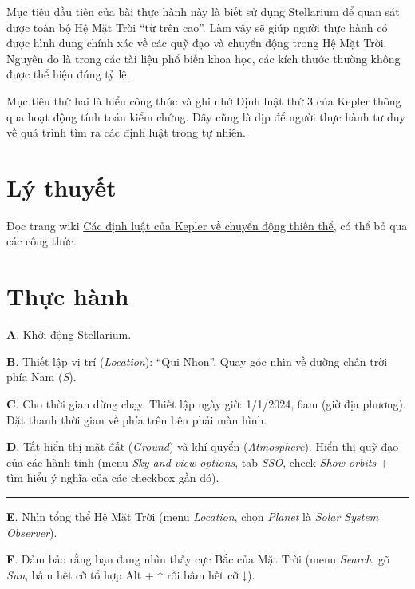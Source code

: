 \documentclass[
]{book}
\begin{document}
Mục tiêu đầu tiên của bài thực hành này là biết sử dụng Stellarium để quan sát được toàn bộ Hệ Mặt Trời ``từ trên cao''. Làm vậy sẽ giúp người thực hành có được hình dung chính xác về các quỹ đạo và chuyển động trong Hệ Mặt Trời. Nguyên do là trong các tài liệu phổ biến khoa học, các kích thước thường không được thể hiện đúng tỷ lệ.

Mục tiêu thứ hai là hiểu công thức và ghi nhớ Định luật thứ 3 của Kepler thông qua hoạt động tính toán kiểm chứng. Đây cũng là dịp để người thực hành tư duy về quá trình tìm ra các định luật trong tự nhiên.

\section{Lý thuyết}\label{luxfd-thuyux1ebft-2}

Đọc trang wiki \href{https://vi.wikipedia.org/wiki/C\%C3\%A1c_\%C4\%91\%E1\%BB\%8Bnh_lu\%E1\%BA\%ADt_Kepler_v\%E1\%BB\%81_chuy\%E1\%BB\%83n_\%C4\%91\%E1\%BB\%99ng_thi\%C3\%AAn_th\%E1\%BB\%83}{Các định luật của Kepler về chuyển động thiên thể}, có thể bỏ qua các công thức.

\section{Thực hành}\label{thux1ef1c-huxe0nh-2}

\textbf{A}. Khởi động Stellarium.

\textbf{B}. Thiết lập vị trí (\emph{Location}): ``Qui Nhon''. Quay góc nhìn về đường chân trời phía Nam (\emph{S}).

\textbf{C}. Cho thời gian dừng chạy. Thiết lập ngày giờ: 1/1/2024, 6am (giờ địa phương). Đặt thanh thời gian về phía trên bên phải màn hình.

\textbf{D}. Tắt hiển thị mặt đất (\emph{Ground}) và khí quyển (\emph{Atmosphere}). Hiển thị quỹ đạo của các hành tinh (menu \emph{Sky and view options}, tab \emph{SSO}, check \emph{Show orbits} + tìm hiểu ý nghĩa của các checkbox gần đó).

\begin{center}\rule{0.5\linewidth}{0.5pt}\end{center}

\textbf{E}. Nhìn tổng thể Hệ Mặt Trời (menu \emph{Location}, chọn \emph{Planet} là \emph{Solar System Observer}).

\textbf{F}. Đảm bảo rằng bạn đang nhìn thấy cực Bắc của Mặt Trời (menu \emph{Search}, gõ \emph{Sun}, bấm hết cỡ tổ hợp Alt + ↑ rồi bấm hết cỡ ↓).
\end{document}
